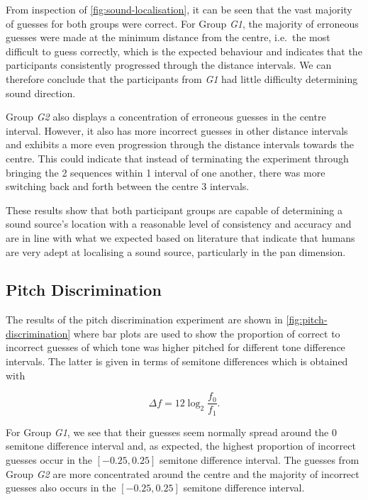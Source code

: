 \documentclass[]{interact}
\begin{document}
From inspection of \cref{fig:sound-localisation}, it can be seen that the vast majority of guesses for both groups were correct.
For Group \textit{G1}, the majority of erroneous guesses were made at the minimum distance from the centre, i.e.\ the most difficult to guess correctly, which is the expected behaviour and indicates that the participants consistently progressed through the distance intervals.
We can therefore conclude that the participants from \textit{G1} had little difficulty determining sound direction.

Group \textit{G2} also displays a concentration of erroneous guesses in the centre interval.
However, it also has more incorrect guesses in other distance intervals and exhibits a more even progression through the distance intervals towards the centre.
This could indicate that instead of terminating the experiment through bringing the 2 sequences within 1 interval of one another, there was more switching back and forth between the centre 3 intervals. 

These results show that both participant groups are capable of determining a sound source's location with a reasonable level of consistency and accuracy and are in line with what we expected based on literature that indicate that humans are very adept at localising a sound source, particularly in the pan dimension. 

\subsection{Pitch Discrimination}

The results of the pitch discrimination experiment are shown in \cref{fig:pitch-discrimination} where bar plots are used to show the proportion of correct to incorrect guesses of which tone was higher pitched for different tone difference intervals. 
The latter is given in terms of semitone differences which is obtained with 

\begin{equation}
\label{eq:semitone-difference}
  \Delta f = 12\log_2\frac{f_0}{f_1}.
\end{equation}

For Group \textit{G1}, we see that their guesses seem normally spread around the 0 semitone difference interval and, as expected, the highest proportion of incorrect guesses occur in the $[-0.25, 0.25]$ semitone difference interval. 
The guesses from Group \textit{G2} are more concentrated around the centre and the majority of incorrect guesses also occurs in the $[-0.25, 0.25]$ semitone difference interval.
\end{document}
